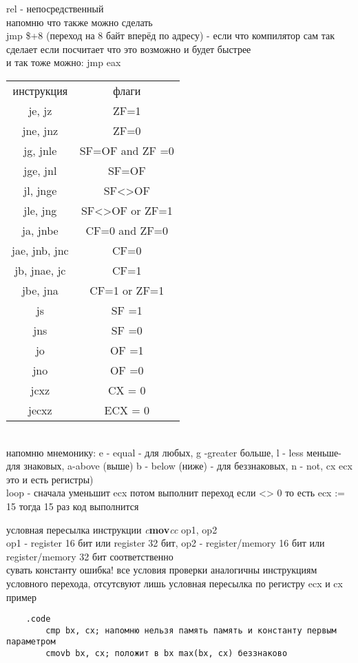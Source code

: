 \documentclass[a4paper,10pt]{article}
\begin{document}
rel - непосредственный \\
напомню что также можно сделать \\
jmp \$+8 (переход на 8 байт вперёд по адресу) - если что компилятор сам так сделает если посчитает что это возможно и будет быстрее \\
и так тоже можно: jmp eax \\
\begin{tabular}{|c|c|}
    \hline
        инструкция&флаги \\
        je, jz & ZF=1 \\
        jne, jnz & ZF=0 \\
        jg, jnle & SF=OF and ZF =0 \\
        jge, jnl & SF=OF \\
        jl, jnge & SF<>OF \\
        jle, jng & SF<>OF or ZF=1 \\
        ja, jnbe & CF=0 and ZF=0 \\
        jae, jnb, jnc & CF=0 \\
        jb, jnae, jc & CF=1 \\
        jbe, jna & CF=1 or ZF=1 \\
        js & SF =1 \\
        jns & SF =0 \\
        jo & OF =1 \\
        jno & OF =0 \\
        jcxz & CX = 0 \\
        jecxz & ECX = 0 \\
    \hline
\end{tabular} \\
напомню мнемонику: e - equal - для любых, g -greater больше, l - less меньше- для знаковых, a-above (выше) b - below (ниже) - для беззнаковых, n - not, cx ecx это и есть регистры) \\
loop - сначала уменьшит ecx потом выполнит переход если <> 0 то есть ecx := 15 тогда 15 раз код выполнится\par
\noindent
условная пересылка инструкции \textit{c}\textbf{mov}\textit{cc} op1, op2\\
op1 - register 16 бит или register 32 бит, op2 - register/memory 16 бит или register/memory 32 бит соответственно \\
сувать константу ошибка! все условия проверки аналогичны инструкциям условного перехода, отсутсвуют лишь условная пересылка по регистру ecx и cx пример\\
\begin{verbatim}
    .code
        cmp bx, cx; напомню нельзя память память и константу первым параметром
        cmovb bx, cx; положит в bx max(bx, cx) беззнаково
\end{verbatim}
\end{document}
